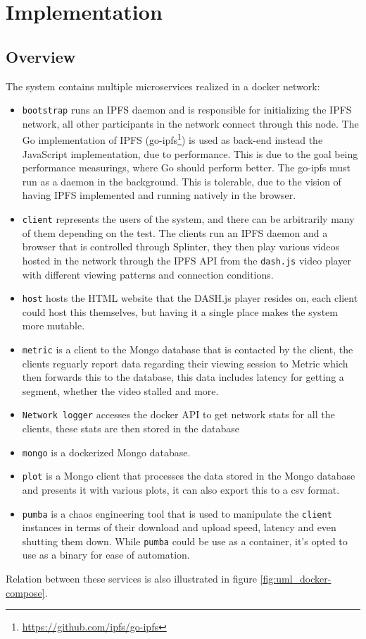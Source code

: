\chapter{Implementation}
\label{cha:implementation}
\section{Overview}
\label{sec:impl-overview}
The system  contains multiple microservices realized in a docker network:
\begin{itemize}
    \item \texttt{bootstrap} runs an IPFS daemon and is responsible for initializing the IPFS network, all other participants in the network connect through this node. 
    The Go implementation of \acs{IPFS} (go-ipfs\footnote{\url{https://github.com/ipfs/go-ipfs}}) is used as back-end instead the JavaScript implementation, due to performance. This is due to the goal being performance measurings, where Go should perform better. The go-ipfs must run as a daemon in the background. This is tolerable, due to the vision of having IPFS implemented and running natively in the browser.
    \item \texttt{client} represents the users of the system, and there can be arbitrarily many of them depending on the test. The clients run an IPFS daemon and a browser that is controlled through Splinter, they then play various videos hosted in the network through the IPFS \acs{API} from the \texttt{dash.js} video player with different viewing patterns and connection conditions.
    \item \texttt{host} hosts the HTML website that the DASH.js player resides on, each client could host this themselves, but having it a single place makes the system more mutable.
    \item \texttt{metric} is a client to the Mongo database that is contacted by the client, the clients reguarly report data regarding their viewing session to Metric which then forwards this to the database, this data includes latency for getting a segment, whether the video stalled and more.
    \item \texttt{Network logger} accesses the docker \acs{API} to get network stats for all the clients, these stats are then stored in the database
    \item \texttt{mongo} is a dockerized Mongo database.
    \item \texttt{plot} is a Mongo client that processes the data stored in the Mongo database and presents it with various plots, it can also export this to a csv format.
    \item \texttt{pumba} is a chaos engineering tool that is used to manipulate the \texttt{client} instances in terms of their download and upload speed, latency and even shutting them down. While \texttt{pumba} could be use as a container, it's opted to use as a binary for ease of automation. 
\end{itemize}
Relation between these services is also  illustrated in figure \ref{fig:uml_docker-compose}.

